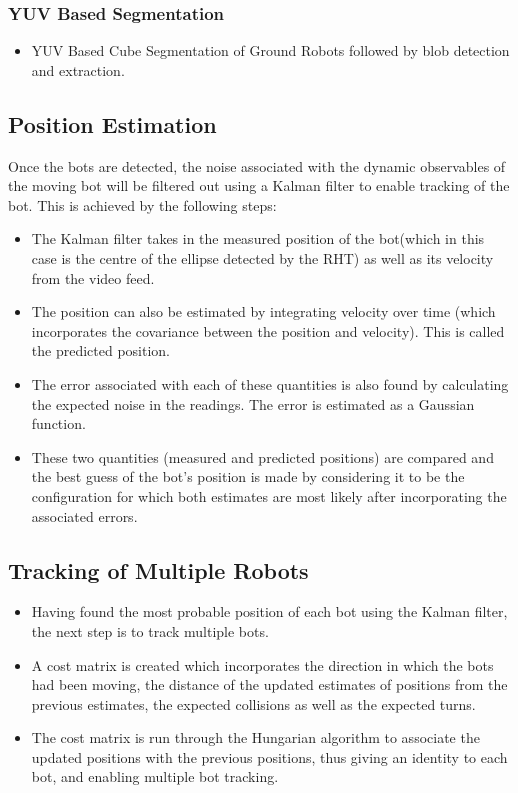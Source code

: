 \documentclass[12pt]{article}
\begin{document}
        \subsubsection{YUV Based Segmentation}
         \begin{itemize}
             \item YUV Based Cube Segmentation of Ground Robots followed by blob detection and extraction.
         \end{itemize}
         
    \subsection{Position Estimation}
        Once the bots are detected, the noise associated with the dynamic observables of the moving bot will be filtered out using a Kalman filter to enable tracking of the bot.  This is achieved by the following steps:
        \begin{itemize}
            \item The Kalman filter takes in the measured position of the bot(which in this case is the centre of the ellipse detected by the RHT) as well as its velocity from the video feed.
            \item The position can also be estimated by integrating velocity over time (which incorporates the covariance between the position and velocity). This is called the predicted position.
            \item The error associated with each of these quantities is also found by calculating the expected noise in the readings. The error is estimated as a Gaussian function. 
            \item These two quantities (measured and predicted positions) are compared and the best guess of the bot’s position is made by considering it to be the configuration for which both estimates are most likely after incorporating the associated errors.
        \end{itemize}
    
    \subsection{Tracking of Multiple Robots}
        \begin{itemize}
            \item Having found the most probable position of each bot using the Kalman filter, the next step is to track multiple bots.
            \item A cost matrix is created which incorporates the direction in which the bots had been moving, the distance of the updated estimates of positions from the previous estimates, the expected collisions as well as the expected turns.
            \item The cost matrix is run through the Hungarian algorithm to associate the updated positions with the previous positions, thus giving an identity to each bot, and enabling multiple bot tracking.
        \end{itemize}
\end{document}
